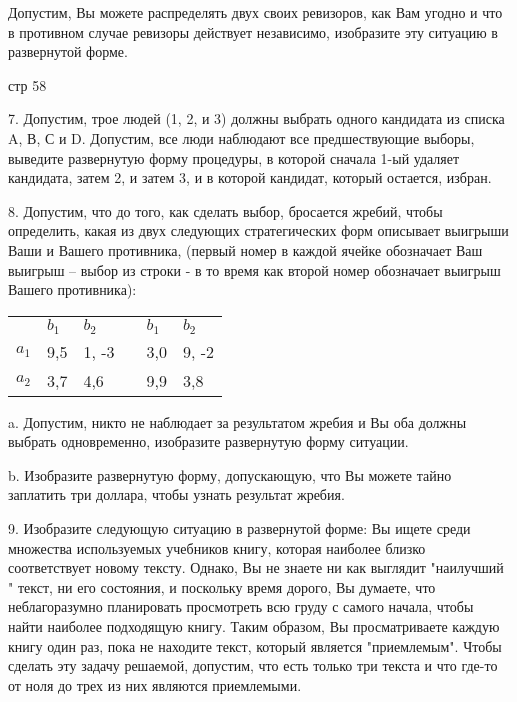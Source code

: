 \documentclass[a4paper,12pt]{article}
\begin{document}
Допустим, Вы можете распределять двух своих
ревизоров, как Вам угодно и что в противном случае
ревизоры действует независимо, изобразите эту
ситуацию в развернутой форме.

стр 58

7. Допустим, трое людей (1, 2, и 3) должны выбрать
одного кандидата из списка A, В, С и D. Допустим,
все люди наблюдают все предшествующие выборы,
выведите развернутую форму процедуры, в которой
сначала 1-ый удаляет кандидата, затем 2, и затем 3,
и в которой кандидат, который остается, избран.

8. Допустим, что до того, как сделать выбор,
бросается жребий, чтобы определить, какая из двух
следующих стратегических форм описывает выигрыши
Ваши и Вашего противника, (первый номер в каждой
ячейке обозначает Ваш выигрыш -- выбор из строки -
в то время как второй номер обозначает выигрыш
Вашего противника):

\bigskip \begin{tabular}{llllll}
& $b_{1}$ & $b_{2}$ &  & $b_{1}$ & $b_{2}$ \\
\cline{2-3}\cline{5-6} $a_{1}$ &
\multicolumn{1}{|l}{9,5} & \multicolumn{1}{|l}{1,
-3} & \multicolumn{1}{|l}{} &
\multicolumn{1}{|l}{3,0} & \multicolumn{1}{|l|}{9,
-2 } \\ \cline{2-3}\cline{5-6} $a_{2}$ &
\multicolumn{1}{|l}{3,7} & \multicolumn{1}{|l}{4,6}
& \multicolumn{1}{|l}{} & \multicolumn{1}{|l}{9,9}
& \multicolumn{1}{|l|}{3,8}
\\ \cline{2-3}\cline{5-6}
\end{tabular}

a. Допустим, никто не наблюдает за результатом
жребия и Вы оба должны выбрать одновременно,
изобразите развернутую форму ситуации.

b. Изобразите развернутую форму, допускающую, что
Вы можете тайно заплатить три доллара, чтобы узнать
результат жребия.

9. Изобразите следующую ситуацию в развернутой
форме: Вы ищете среди множества используемых
учебников книгу, которая наиболее близко
соответствует новому тексту. Однако, Вы не знаете
ни как выглядит "наилучший " текст, ни его
состояния, и поскольку время дорого, Вы думаете,
что неблагоразумно планировать просмотреть всю
груду с самого начала, чтобы найти наиболее
подходящую книгу. Таким образом, Вы просматриваете
каждую книгу один раз, пока не находите текст,
который является "приемлемым". Чтобы сделать эту
задачу решаемой, допустим, что есть только три
текста и что где-то от ноля до трех из них являются
приемлемыми.
\end{document}
